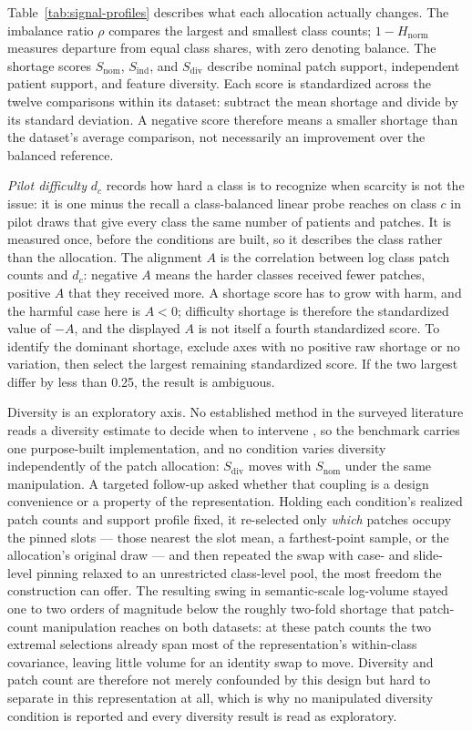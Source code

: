 \documentclass[11pt]{article}
\begin{document}
Table~\ref{tab:signal-profiles} describes what each allocation actually changes. The imbalance ratio $\rho$ compares the largest and smallest class counts; $1-H_{\mathrm{norm}}$ measures departure from equal class shares, with zero denoting balance. The shortage scores $S_{\mathrm{nom}}$, $S_{\mathrm{ind}}$, and $S_{\mathrm{div}}$ describe nominal patch support, independent patient support, and feature diversity. Each score is standardized across the twelve comparisons within its dataset: subtract the mean shortage and divide by its standard deviation. A negative score therefore means a smaller shortage than the dataset's average comparison, not necessarily an improvement over the balanced reference.

\emph{Pilot difficulty} $d_c$ records how hard a class is to recognize when scarcity is not the issue: it is one minus the recall a class-balanced linear probe reaches on class $c$ in pilot draws that give every class the same number of patients and patches. It is measured once, before the conditions are built, so it describes the class rather than the allocation. The alignment $A$ is the correlation between log class patch counts and $d_c$: negative $A$ means the harder classes received fewer patches, positive $A$ that they received more. A shortage score has to grow with harm, and the harmful case here is $A<0$; difficulty shortage is therefore the standardized value of $-A$, and the displayed $A$ is not itself a fourth standardized score. To identify the dominant shortage, exclude axes with no positive raw shortage or no variation, then select the largest remaining standardized score. If the two largest differ by less than \num{0.25}, the result is ambiguous.

Diversity is an exploratory axis. No established method in the surveyed literature reads a diversity estimate to decide when to intervene \citep{queisler2026imbalanceMethods}, so the benchmark carries one purpose-built implementation, and no condition varies diversity independently of the patch allocation: $S_{\mathrm{div}}$ moves with $S_{\mathrm{nom}}$ under the same manipulation. A targeted follow-up asked whether that coupling is a design convenience or a property of the representation. Holding each condition's realized patch counts and support profile fixed, it re-selected only \emph{which} patches occupy the pinned slots --- those nearest the slot mean, a farthest-point sample, or the allocation's original draw --- and then repeated the swap with case- and slide-level pinning relaxed to an unrestricted class-level pool, the most freedom the construction can offer. The resulting swing in semantic-scale log-volume stayed one to two orders of magnitude below the roughly two-fold shortage that patch-count manipulation reaches on both datasets: at these patch counts the two extremal selections already span most of the representation's within-class covariance, leaving little volume for an identity swap to move. Diversity and patch count are therefore not merely confounded by this design but hard to separate in this representation at all, which is why no manipulated diversity condition is reported and every diversity result is read as exploratory.
\end{document}
